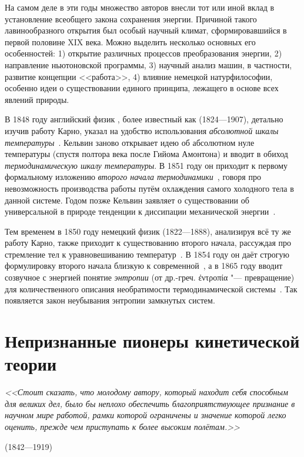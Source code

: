 \documentclass[a4paper, 12pt, oneside]{article} %
\begin{document}
На самом деле в эти годы множество авторов внесли тот или иной вклад в
установление всеобщего закона сохранения энергии. Причиной такого
лавинообразного открытия был особый научный климат, сформировавшийся в
первой половине XIX века. Можно выделить несколько основных его
особенностей: 1) открытие различных процессов преобразования энергии, 2)
направление ньютоновской программы, 3) научный анализ машин, в
частности, развитие концепции <<работа>>, 4) влияние немецкой
натурфилософии, особенно идеи о существовании единого принципа, лежащего
в основе всех явлений природы.

В 1848 году английский физик , более известный как
 (1824---1907), детально изучив работу Карно,
указал на удобство использования \emph{абсолютной шкалы
температуры}~\cite{thomson1849carnot}. Кельвин заново открывает идею об
абсолютном нуле температуры (спустя полтора века после Гийома Амонтона)
и вводит в обиход \emph{термодинамическую шкалу температуры}. В 1851
году он приходит к первому формальному изложению \emph{второго начала
термодинамики}~\cite{thomson1853dynamical}, говоря про невозможность
производства работы путём охлаждения самого холодного тела в данной
системе. Годом позже Кельвин заявляет о существовании об универсальной в
природе тенденции к диссипации механической
энергии~\cite{thomson1852dissipation}.

Тем временем в 1850 году немецкий физик 
(1822---1888), анализируя всё ту же работу Карно, также приходит к
существованию второго начала, рассуждая про стремление тел к
уравновешиванию температур~\cite{clausius1850carnot}. В 1854 году он
даёт строгую формулировку второго начала близкую к
современной~\cite{clausius1854second}, а в 1865 году вводит созвучное с
энергией понятие \emph{энтропии} (от др.-греч.
\foreignlanguage{greek}{ἐντροπία} "--- превращение) для количественного
описания необратимости термодинамической
системы~\cite{clausius1865entropy}. Так появляется закон неубывания
энтропии замкнутых систем.

\section{Непризнанные пионеры кинетической теории}

\epigraph{\textit{<<Стоит сказать, что молодому автору, который находит
себя способным для великих дел, было бы неплохо обеспечить
благоприятствующее признание в научном мире работой, рамки которой
ограничены и значение которой легко оценить, прежде чем приступать к
более высоким полётам.>>}}{ (1842---1919)}
\end{document}
